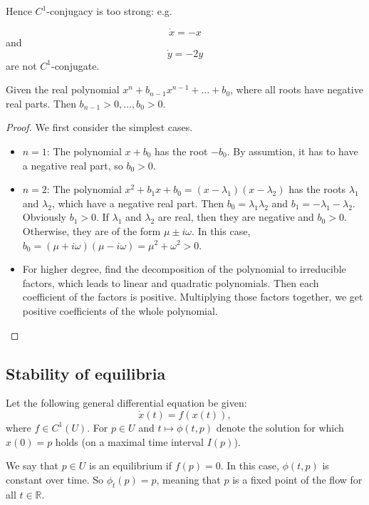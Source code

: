 \documentclass{article}
\newcommand*{\R}{\mathbb{R}}
\begin{document}
Hence $C^1$-conjugacy is too strong: e.g.

$$\dot x = -x$$
and
$$\dot y = -2y$$
are not $C^1$-conjugate.

\begin{rem}
    Given the real polynomial $x^n+b_{n-1}x^{n-1} +\dots + b_0$, where all roots have negative real parts. Then $b_{n-1} > 0, \dots, b_0 > 0$.
\end{rem}

\begin{proof}
    We first consider the simplest cases.
    \begin{itemize}
        \item $n=1$: The polynomial $x + b_0$ has the root $-b_0$. By assumtion, it has to have a negative real part, so $b_0 > 0$.

        \item $n=2$: The polynomial $x^2+b_1x+b_0=(x-\lambda_1)(x-\lambda_2)$ has the roots $\lambda_1$ and $\lambda_2$, which have a negative real part. Then $b_0 = \lambda_1\lambda_2$ and $b_1 = -\lambda_1-\lambda_2$. Obviously $b_1 > 0$. If $\lambda_1$ and $\lambda_2$ are real, then they are negative and $b_0>0$. Otherwise, they are of the form $\mu\pm i\omega$. In this case, $b_0 = (\mu+i\omega)(\mu-i\omega) = \mu^2+\omega^2 > 0$.

        \item For higher degree, find the decomposition of the polynomial to irreducible factors, which leads to linear and quadratic polynomials. Then each coefficient of the factors is positive. Multiplying those factors together, we get positive coefficients of the whole polynomial.
    \end{itemize}
\end{proof}

\subsection{Stability of equilibria}

Let the following general differential equation be given:
$$\dot x(t)=f(x(t)),$$
where $f \in C^1(U)$. For $p\in U$ and $ t\mapsto \phi(t,p)$ denote the solution for which $x(0)=p$ holds (on a maximal time interval $I(p)$).

\begin{defin}
    We say that $p\in U$ is an equilibrium if $f(p) = 0$. In this case, $\phi(t,p)$ is constant over time. So $\phi_t(p)=p$, meaning that $p$ is a fixed point of the flow for all $t \in \R$.
\end{defin}
\end{document}
